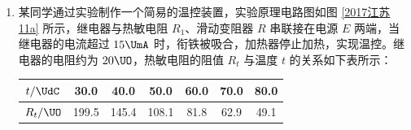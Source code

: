 \documentclass[\gkver]{gaokaozhenti}
\begin{document}
\begin{enumerate}
\begin{enumerate}
	请根据表中的数据，在答题卡的方格纸上作出 $\Delta E_{k}-W$ 图象。

	\onepicture[w=6.69cm]{}

	\item
	实验结果表明，$\Delta E_{k}$ 总是略小于 $W$。某同学猜想是由于小车所受拉力小于钩码重力造成的。用题中小车和钩码质量的数据可算出小车受到的实际拉力 $F = \tkanswer[1.5cm]{0.093}\UN$。
\end{enumerate}


\item
某同学通过实验制作一个简易的温控装置，实验原理电路图如图 \ref{2017江苏11a} 所示，继电器与热敏电阻 $R_{1}$、滑动变阻器 $R$ 串联接在电源 $E$ 两端，当继电器的电流超过 $15\UmA$ 时，衔铁被吸合，加热器停止加热，实现温控。继电器的电阻约为 $20\UO$，热敏电阻的阻值 $R_{t}$ 与温度 $t$ 的关系如下表所示：

\begin{center}
\begin{tabular}{|c|c|c|c|c|c|c|}
\hline
$t/\UdC$ & 30.0 & 40.0 & 50.0 & 60.0 & 70.0 & 80.0 \\
\hline
$R_{t}/\UO$ & 199.5 & 145.4 & 108.1 & 81.8 & 62.9 & 49.1 \\
\hline
\end{tabular}
\end{center}


\end{enumerate}
\end{document}
